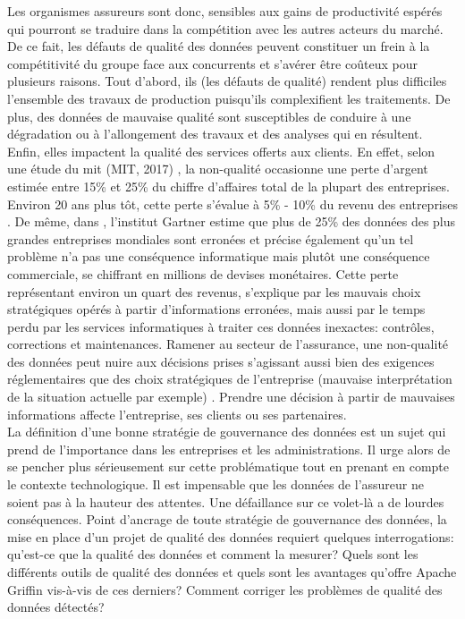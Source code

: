 Les organismes assureurs sont donc, sensibles aux gains de productivité espérés qui pourront se traduire dans la compétition avec les autres acteurs du marché. De ce fait, les défauts de qualité des données peuvent constituer un frein à la compétitivité du groupe face aux concurrents et s’avérer être coûteux pour plusieurs raisons. Tout d’abord, ils (les d\'efauts de qualit\'e) rendent plus difficiles l’ensemble des travaux de production puisqu’ils complexifient les traitements. De plus, des données de mauvaise qualité sont susceptibles de conduire à une dégradation ou à l’allongement des travaux et des analyses qui en résultent. Enfin, elles impactent la qualit\'e des services offerts aux clients. En effet, selon une étude du \acrfull{mit} (MIT, 2017) \cite{MIT2017}, la non-qualité occasionne une perte d'argent estimée entre 15\% et 25\% du chiffre d’affaires total de la plupart des entreprises. Environ 20 ans plus t\^ot, cette perte s'\'evalue \`a 5\% - 10\% du revenu des entreprises \cite{Techno7}. De m\^eme, dans \cite{efrontech},  l’institut Gartner estime que plus de 25\% des données des plus grandes entreprises mondiales sont erronées et précise \'egalement qu'un tel probl\`eme n’a pas une conséquence informatique mais plut\^ot une cons\'equence commerciale, se chiffrant en millions de devises mon\'etaires. Cette perte représentant environ un quart des revenus, s’explique par les mauvais choix stratégiques opérés à partir d’informations erronées, mais aussi par le temps perdu par les services informatiques à traiter ces données inexactes:  contr\^oles, corrections et maintenances. Ramener au secteur de l'assurance, une non-qualit\'e des donn\'ees peut nuire aux décisions prises s’agissant aussi bien des exigences r\'eglementaires que des choix strat\'egiques de l’entreprise (mauvaise interprétation de la situation actuelle par exemple) \cite{Axysweb_Consequences}. Prendre une décision à partir de mauvaises informations affecte l’entreprise, ses clients ou ses partenaires.
\\

La d\'efinition d'une bonne strat\'egie de gouvernance des données est un sujet qui prend de l’importance dans les entreprises et les administrations. Il urge alors de se pencher plus s\'erieusement sur cette probl\'ematique tout en prenant en compte le contexte technologique. Il est impensable que les données de l’assureur ne soient pas à la hauteur des attentes. Une défaillance sur ce volet-là a de lourdes conséquences. Point d'ancrage de toute strat\'egie de gouvernance des donn\'ees, la mise en place d'un projet de qualit\'e des donn\'ees requiert quelques interrogations: qu'est-ce que la qualit\'e des donn\'ees et comment la mesurer? Quels sont les diff\'erents outils de qualit\'e des donn\'ees et quels sont les avantages qu'offre Apache Griffin vis-\`a-vis de ces derniers? Comment corriger les probl\`emes de qualit\'e des donn\'ees d\'etect\'es?


